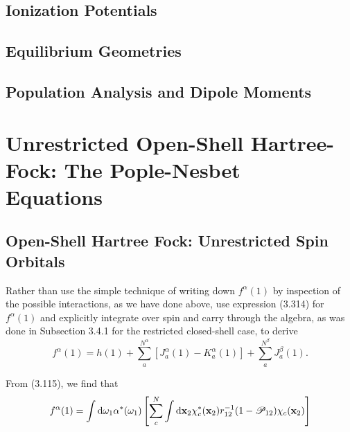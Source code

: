 \documentclass[a4paper]{book}
\newcounter{exercise}[chapter]
\newcounter{solution}[chapter]
\newcommand*{\dif}{\mathop{}\!\mathrm{d}}
\newcommand{\bfx}{{\bf x}}
\begin{document}
	\subsection{Ionization Potentials}
	
	\subsection{Equilibrium Geometries}
	
	\subsection{Population Analysis and Dipole Moments}
	
	\section{Unrestricted Open-Shell Hartree-Fock: The Pople-Nesbet \texorpdfstring{\\}- Equations}
	
	\subsection{Open-Shell Hartree Fock: Unrestricted Spin Orbitals}

	\begin{exercise}
	Rather than use the simple technique of writing down $f^\alpha(1)$ by inspection of the possible interactions, as we have done above, use expression (3.314) for $f^\alpha(1)$  and explicitly integrate over spin and carry through the algebra, as was done in Subsection 3.4.1 for the restricted closed-shell case, to derive
	\[
		f^\alpha(1) = h(1) + \sum_a^{N^\alpha} \left[ J^\alpha_a(1) - K^\alpha_a(1) \right] + \sum_a^{N^\beta} J^\beta_a(1).
	\]
	\end{exercise}
	
	\begin{solution}
	
	From (3.115), we find that
	\begin{align*}
		f^\alpha(1) &= \int \dif \omega_1 \alpha^*( \omega_1 ) \left[ \sum_c^N \int \dif \bfx_2 \chi^*_c( \bfx_2 ) r^{-1}_{12} ( 1 - \mathscr{P}_{12} ) \chi_c ( \bfx_2 ) \right] \\
	\end{align*}
	
	\end{solution}
\end{document}
